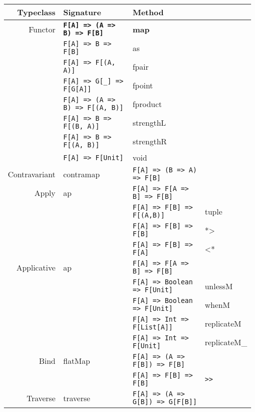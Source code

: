\documentclass{tufte-handout}
\begin{document}
\begin{table}[ht]
  \centering
  \selectfont
  \begin{tabular}{rlll}
    Typeclass & Signature & Method\\
    \midrule
    Functor & \textbf{\texttt{F[A] => \hfill (A => B) => F[B]}} & \textbf{map} \\
            & \texttt{F[A] => \hfill B => F[B]} & as \\
            & \texttt{F[A] => \hfill F[(A, A)]} & fpair \\
            & \texttt{F[A] => \hfill G[\_] => F[G[A]]} & fpoint \\
            & \texttt{F[A] => \hfill (A => B) => F[(A, B)]} & fproduct \\
            & \texttt{F[A] => \hfill B => F[(B, A)]} & strengthL \\
            & \texttt{F[A] => \hfill B => F[(A, B)]} & strengthR \\
            & \texttt{F[A] => \hfill F[Unit]} & void \\[.5cm]
    Contravariant & contramap & \texttt{F[A] => \hfill (B => A) => F[B]} \\[.5cm]
    Apply         & ap & \texttt{F[A] => \hfill F[A => B] => F[B]} \\
                  &    & \texttt{F[A] => \hfill F[B] => F[(A,B)]} & tuple \\
                  &    & \texttt{F[A] => \hfill F[B] => F[B]} & *> \\
                  &    & \texttt{F[A] => \hfill F[B] => F[A]} & <* \\[.5cm]
    Applicative   & ap & \texttt{F[A] => \hfill F[A => B] => F[B]} \\
                  & & \texttt{F[A] => \hfill Boolean => F[Unit]} & unlessM \\
                  & & \texttt{F[A] => \hfill Boolean => F[Unit]} & whenM \\
                  & & \texttt{F[A] => \hfill Int => F[List[A]]} & replicateM \\
                  & & \texttt{F[A] => \hfill Int => F[Unit]} & replicateM\_ \\[.5cm]
    Bind          & flatMap & \texttt{F[A] => \hfill (A => F[B]) => F[B]} \\
                  &         & \texttt{F[A] => \hfill F[B] => F[B]} & \verb$>>$ \\[.5cm]
    Traverse      & traverse & \texttt{F[A] => \hfill (A => G[B]) => G[F[B]]} \\

\end{tabular}
\end{table}
\end{document}
